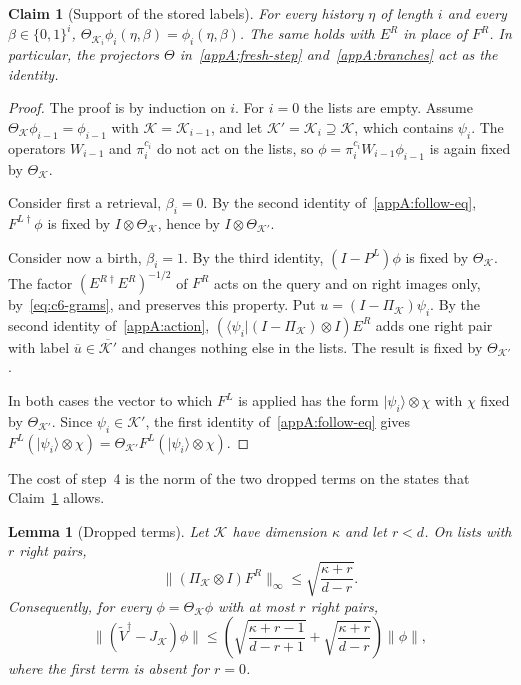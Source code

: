 \documentclass[11pt,letterpaper]{article}
\newtheorem{lemma}[theorem]{Lemma}
\newtheorem{claim}[theorem]{Claim}
\theoremstyle{definition}\newtheorem{definition}[theorem]{Definition}
\newcommand{\ket}[1]{\lvert#1\rangle}
\newcommand{\bra}[1]{\langle#1\rvert}
\newcommand{\norm}[1]{\lVert#1\rVert}
\begin{document}
\begin{claim}[Support of the stored labels]\label{appA:support}
For every history $\eta$ of length $i$ and every $\beta\in\{0,1\}^i$,
$\Theta_{\mathcal K_i}\phi_i(\eta,\beta)=\phi_i(\eta,\beta)$. The same
holds with $E^R$ in place of $F^R$. In particular, the projectors
$\Theta$ in~\eqref{appA:fresh-step} and~\eqref{appA:branches} act as
the identity.
\end{claim}

\begin{proof}
The proof is by induction on $i$. For $i=0$ the lists are empty. Assume
$\Theta_{\mathcal K}\phi_{i-1}=\phi_{i-1}$ with
$\mathcal K=\mathcal K_{i-1}$, and let
$\mathcal K'=\mathcal K_i\supseteq\mathcal K$, which contains
$\psi_i$. The operators $W_{i-1}$ and $\pi^{c_i}_i$ do not act on the
lists, so $\phi=\pi^{c_i}_iW_{i-1}\phi_{i-1}$ is again fixed by
$\Theta_{\mathcal K}$.

Consider first a retrieval, $\beta_i=0$. By the second identity
of~\eqref{appA:follow-eq}, $F^{L\dagger}\phi$ is fixed by
$I\otimes\Theta_{\mathcal K}$, hence by
$I\otimes\Theta_{\mathcal K'}$.

Consider now a birth, $\beta_i=1$. By the third identity, $(I-P^L)\phi$ is
fixed by
$\Theta_{\mathcal K}$. The factor $(E^{R\dagger}E^R)^{-1/2}$ of $F^R$
acts on the query and on right images only, by~\eqref{eq:c6-grams},
and preserves this property. Put $u=(I-\Pi_{\mathcal K})\psi_i$. By
the second identity of~\eqref{appA:action},
$(\bra{\psi_i}(I-\Pi_{\mathcal K})\otimes I)E^R$ adds one right pair
with label $\overline u\in\overline{\mathcal K'}$ and changes nothing
else in the lists. The result is fixed by $\Theta_{\mathcal K'}$.

In both cases the vector to which $F^L$ is applied has the form
$\ket{\psi_i}\otimes\chi$ with $\chi$ fixed by $\Theta_{\mathcal K'}$.
Since $\psi_i\in\mathcal K'$, the first identity
of~\eqref{appA:follow-eq} gives
$F^L(\ket{\psi_i}\otimes\chi)
=\Theta_{\mathcal K'}F^L(\ket{\psi_i}\otimes\chi)$.
\end{proof}

The cost of step~4 is the norm of the two dropped terms on the states
that Claim~\ref{appA:support} allows.

\begin{lemma}[Dropped terms]\label{appA:fresh-cost}
Let $\mathcal K$ have dimension $\kappa$ and let $r<d$. On lists with
$r$ right pairs,
\begin{equation}\label{eq:c6-right-compression}
 \norm{(\Pi_{\mathcal K}\otimes I)F^R}_\infty
 \le\sqrt{\frac{\kappa+r}{d-r}} .
\end{equation}
Consequently, for every $\phi=\Theta_{\mathcal K}\phi$ with at most
$r$ right pairs,
\[
 \norm{(\widetilde V^\dagger-J_{\mathcal K})\phi}\le
 \left(\sqrt{\frac{\kappa+r-1}{d-r+1}}
       +\sqrt{\frac{\kappa+r}{d-r}}\right)\norm\phi ,
\]
where the first term is absent for $r=0$.
\end{lemma}
\end{document}
